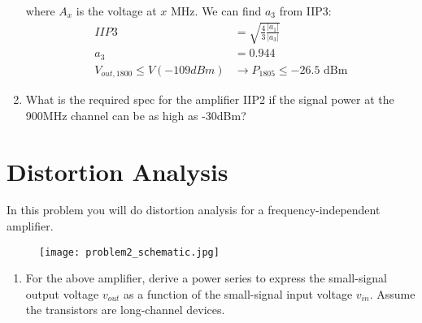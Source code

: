 \begin{enumerate}[label=(\alph*)]
    where $A_{x}$ is the voltage at $x$ MHz. We can find $a_3$ from IIP3:
    \begin{align*}
        IIP3 &= \sqrt{\frac{4}{3} \frac{|a_1|}{|a_3|}} \\
        a_3 &= 0.944 \\
        V_{out,1800} \leq V(-109 dBm) &\rightarrow P_{1805} \leq -26.5 \text{ dBm}
    \end{align*}

    \item {\color{blue}What is the required spec for the amplifier IIP2 if the signal power at the 900MHz channel can be as high as -30dBm?}
\end{enumerate}

\section{Distortion Analysis}
{\color{blue} In this problem you will do distortion analysis for a frequency-independent amplifier.}
\begin{figure}[H]
    \centering \texttt{[image: problem2\_schematic.jpg]}
\end{figure}

\begin{enumerate}[label=(\alph*)]
    \item {\color{blue} For the above amplifier, derive a power series to express the small-signal output voltage $v_{out}$ as a function of the small-signal input voltage $v_{in}$. Assume the transistors are long-channel devices.}


\end{enumerate}


